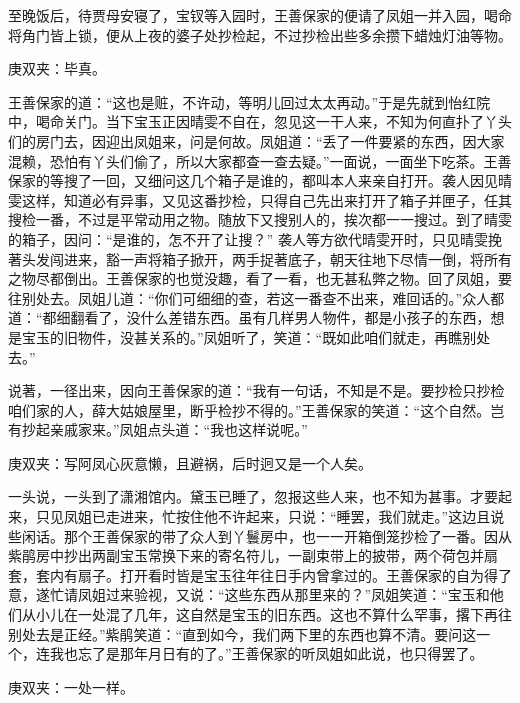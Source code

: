\begin{parag}
    至晚饭后，待贾母安寝了，宝钗等入园时，王善保家的便请了凤姐一并入园，喝命将角门皆上锁，便从上夜的婆子处抄检起，不过抄检出些多余攒下蜡烛灯油等物。\begin{note}庚双夹：毕真。\end{note}王善保家的道：“这也是赃，不许动，等明儿回过太太再动。”于是先就到怡红院中，喝命关门。当下宝玉正因晴雯不自在，忽见这一干人来，不知为何直扑了丫头们的房门去，因迎出凤姐来，问是何故。凤姐道：“丢了一件要紧的东西，因大家混赖，恐怕有丫头们偷了，所以大家都查一查去疑。”一面说，一面坐下吃茶。王善保家的等搜了一回，又细问这几个箱子是谁的，都叫本人来亲自打开。袭人因见晴雯这样，知道必有异事，又见这番抄检，只得自己先出来打开了箱子并匣子，任其搜检一番，不过是平常动用之物。随放下又搜别人的，挨次都一一搜过。到了晴雯的箱子，因问：“是谁的，怎不开了让搜？” 袭人等方欲代晴雯开时，只见晴雯挽著头发闯进来，豁一声将箱子掀开，两手捉著底子，朝天往地下尽情一倒，将所有之物尽都倒出。王善保家的也觉没趣，看了一看，也无甚私弊之物。回了凤姐，要往别处去。凤姐儿道：“你们可细细的查，若这一番查不出来，难回话的。”众人都道：“都细翻看了，没什么差错东西。虽有几样男人物件，都是小孩子的东西，想是宝玉的旧物件，没甚关系的。”凤姐听了，笑道：“既如此咱们就走，再瞧别处去。”
\end{parag}


\begin{parag}
    说著，一径出来，因向王善保家的道：“我有一句话，不知是不是。要抄检只抄检咱们家的人，薛大姑娘屋里，断乎检抄不得的。”王善保家的笑道：“这个自然。岂有抄起亲戚家来。”凤姐点头道：“我也这样说呢。”\begin{note}庚双夹：写阿凤心灰意懒，且避祸，后时迥又是一个人矣。\end{note}一头说，一头到了潇湘馆内。黛玉已睡了，忽报这些人来，也不知为甚事。才要起来，只见凤姐已走进来，忙按住他不许起来，只说：“睡罢，我们就走。”这边且说些闲话。那个王善保家的带了众人到丫鬟房中，也一一开箱倒笼抄检了一番。因从紫鹃房中抄出两副宝玉常换下来的寄名符儿，一副束带上的披带，两个荷包并扇套，套内有扇子。打开看时皆是宝玉往年往日手内曾拿过的。王善保家的自为得了意，遂忙请凤姐过来验视，又说：“这些东西从那里来的？”凤姐笑道：“宝玉和他们从小儿在一处混了几年，这自然是宝玉的旧东西。这也不算什么罕事，撂下再往别处去是正经。”紫鹃笑道：“直到如今，我们两下里的东西也算不清。要问这一个，连我也忘了是那年月日有的了。”王善保家的听凤姐如此说，也只得罢了。\begin{note}庚双夹：一处一样。\end{note}
\end{parag}


